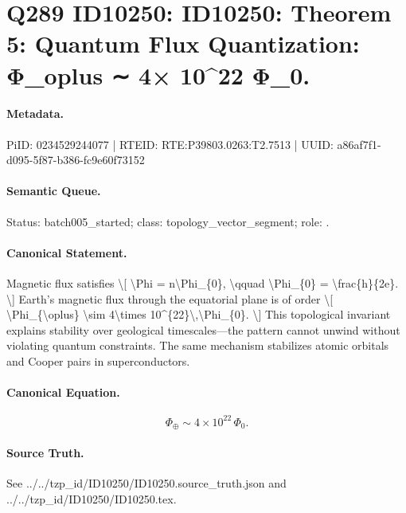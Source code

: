 \section*{Q289 ID10250: ID10250: Theorem 5: Quantum Flux Quantization: Φ\_oplus ∼ 4× 10\textasciicircum{}22 Φ\_0.}
\paragraph{Metadata.}
PiID: 0234529244077 | RTEID: RTE:P39803.0263:T2.7513 | UUID: a86af7f1-d095-5f87-b386-fc9e60f73152

\paragraph{Semantic Queue.}
Status: batch005\_started; class: topology\_vector\_segment; role: .

\paragraph{Canonical Statement.}
Magnetic flux satisfies \textbackslash{}[ \textbackslash{}Phi = n\textbackslash{}Phi\_\{0\}, \textbackslash{}qquad \textbackslash{}Phi\_\{0\} = \textbackslash{}frac\{h\}\{2e\}. \textbackslash{}] Earth's magnetic flux through the equatorial plane is of order \textbackslash{}[ \textbackslash{}Phi\_\{\textbackslash{}oplus\} \textbackslash{}sim 4\textbackslash{}times 10\textasciicircum{}\{22\}\textbackslash{},\textbackslash{}Phi\_\{0\}. \textbackslash{}] This topological invariant explains stability over geological timescales—the pattern cannot unwind without violating quantum constraints. The same mechanism stabilizes atomic orbitals and Cooper pairs in superconductors.

\paragraph{Canonical Equation.}
\[
\Phi_{\oplus} \sim 4\times 10^{22}\,\Phi_{0}.
\]

\paragraph{Source Truth.}
See ../../tzp\_id/ID10250/ID10250.source\_truth.json and ../../tzp\_id/ID10250/ID10250.tex.
